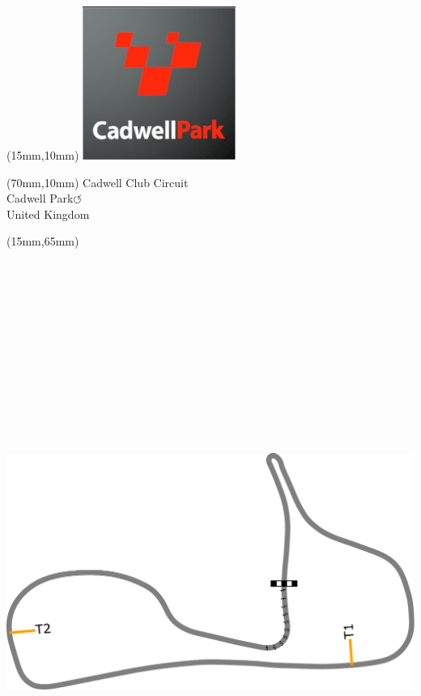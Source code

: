 \null\newpage
\begin{textblock*}{50mm}(15mm,10mm)%
\includegraphics[width=50mm]{LG/2015-05-20_00076.png}
\end{textblock*}
\begin{textblock*}{130mm}(70mm,10mm)%
{\fontsize{20}{20}\selectfont Cadwell Club Circuit\\}
{\fontsize{16}{16}\selectfont Cadwell Park\hfill \huge$\circlearrowleft$\\}
{\fontsize{12}{12}\selectfont United Kingdom\\}
\end{textblock*}
\begin{textblock*}{185mm}(15mm,65mm)%
\centering
\mbox{\includegraphics[width=185mm,height=210mm,keepaspectratio]{PT/CADCLC.pdf}}
\end{textblock*}
